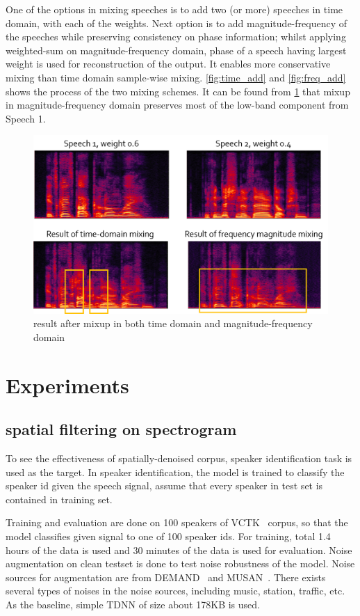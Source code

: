 \documentclass[10pt,twocolumn,letterpaper]{article}
\begin{document}
One of the options in mixing speeches is to add two (or more) speeches in time domain, with each of the weights.
Next option is to add magnitude-frequency of the speeches while preserving consistency on phase information;
whilst applying weighted-sum on magnitude-frequency domain, phase of a speech having largest weight is used 
for reconstruction of the output. It enables more conservative mixing than time domain sample-wise mixing.
\cref{fig:time_add} and \cref{fig:freq_add} shows the process of the two mixing schemes.
It can be found from \cref{fig:add_result} that mixup in magnitude-frequency domain preserves most of the 
low-band component from Speech 1.

\begin{figure}[h]
   \centering
   \includegraphics[width=\linewidth]{add_result}
   \caption{result after mixup in both time domain and magnitude-frequency domain}
   \label{fig:add_result}
\end{figure}

\section{Experiments}
\label{sec:experiments}

\subsection{spatial filtering on spectrogram}
To see the effectiveness of spatially-denoised corpus, speaker identification task is used as the target.
In speaker identification, the model is trained to classify the speaker id given the speech signal,
assume that every speaker in test set is contained in training set.

Training and evaluation are done on 100 speakers of VCTK~\cite{veaux2017cstr} corpus, so that
the model classifies given signal to one of 100 speaker ids.
For training, total 1.4 hours of the data is used and 30 minutes of the data is used for evaluation.
Noise augmentation on clean testset is done to test noise robustness of the model.
Noise sources for augmentation are from DEMAND~\cite{thiemann2013diverse} and MUSAN~\cite{snyder2015musan}.
There exists several types of noises in the noise sources, including music, station, traffic, etc.
As the baseline, simple TDNN of size about 178KB is used. 
\end{document}
